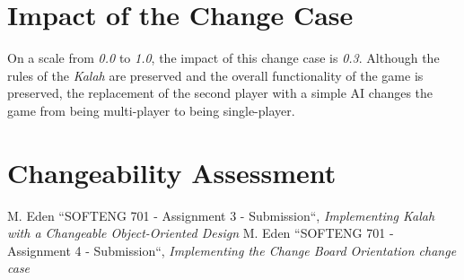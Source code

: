 \documentclass[10pt, a4paper, conference]{IEEEtran}
\begin{document}
\section{Impact of the Change Case}
On a scale from \textit{0.0} to \textit{1.0}, the impact of this change case is
\textit{0.3}. Although the rules of the \textit{Kalah} are preserved and the
overall functionality of the game is preserved, the replacement of the second
player with a simple AI changes the game from being multi-player to being
single-player.

\section{Changeability Assessment}

\begin{thebibliography}{00}
   M. Eden ``SOFTENG 701 - Assignment 3 - Submission``,
    \textit{Implementing Kalah with a Changeable Object-Oriented Design}
   M. Eden ``SOFTENG 701 - Assignment 4 - Submission``,
    \textit{Implementing the Change Board Orientation change case}
\end{thebibliography}
\end{document}
